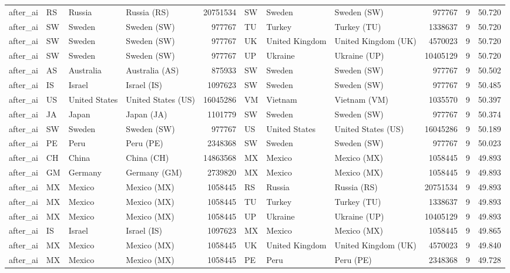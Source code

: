 \begin{tabular}{llllrlllrrr}
after\_ai & RS & Russia & Russia (RS) & 20751534 & SW & Sweden & Sweden (SW) & 977767 & 9 & 50.720 \\
after\_ai & SW & Sweden & Sweden (SW) & 977767 & TU & Turkey & Turkey (TU) & 1338637 & 9 & 50.720 \\
after\_ai & SW & Sweden & Sweden (SW) & 977767 & UK & United Kingdom & United Kingdom (UK) & 4570023 & 9 & 50.720 \\
after\_ai & SW & Sweden & Sweden (SW) & 977767 & UP & Ukraine & Ukraine (UP) & 10405129 & 9 & 50.720 \\
after\_ai & AS & Australia & Australia (AS) & 875933 & SW & Sweden & Sweden (SW) & 977767 & 9 & 50.502 \\
after\_ai & IS & Israel & Israel (IS) & 1097623 & SW & Sweden & Sweden (SW) & 977767 & 9 & 50.485 \\
after\_ai & US & United States & United States (US) & 16045286 & VM & Vietnam & Vietnam (VM) & 1035570 & 9 & 50.397 \\
after\_ai & JA & Japan & Japan (JA) & 1101779 & SW & Sweden & Sweden (SW) & 977767 & 9 & 50.374 \\
after\_ai & SW & Sweden & Sweden (SW) & 977767 & US & United States & United States (US) & 16045286 & 9 & 50.189 \\
after\_ai & PE & Peru & Peru (PE) & 2348368 & SW & Sweden & Sweden (SW) & 977767 & 9 & 50.023 \\
after\_ai & CH & China & China (CH) & 14863568 & MX & Mexico & Mexico (MX) & 1058445 & 9 & 49.893 \\
after\_ai & GM & Germany & Germany (GM) & 2739820 & MX & Mexico & Mexico (MX) & 1058445 & 9 & 49.893 \\
after\_ai & MX & Mexico & Mexico (MX) & 1058445 & RS & Russia & Russia (RS) & 20751534 & 9 & 49.893 \\
after\_ai & MX & Mexico & Mexico (MX) & 1058445 & TU & Turkey & Turkey (TU) & 1338637 & 9 & 49.893 \\
after\_ai & MX & Mexico & Mexico (MX) & 1058445 & UP & Ukraine & Ukraine (UP) & 10405129 & 9 & 49.893 \\
after\_ai & IS & Israel & Israel (IS) & 1097623 & MX & Mexico & Mexico (MX) & 1058445 & 9 & 49.865 \\
after\_ai & MX & Mexico & Mexico (MX) & 1058445 & UK & United Kingdom & United Kingdom (UK) & 4570023 & 9 & 49.840 \\
after\_ai & MX & Mexico & Mexico (MX) & 1058445 & PE & Peru & Peru (PE) & 2348368 & 9 & 49.728 \\

\end{tabular}

